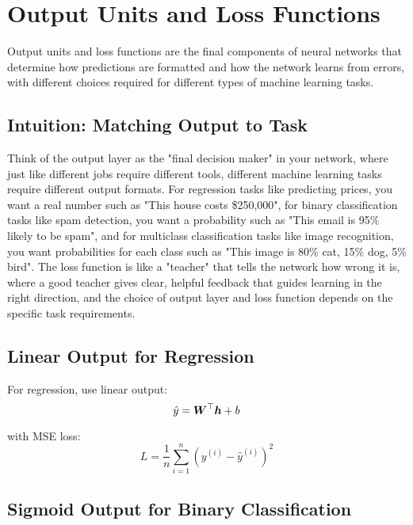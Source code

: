 
\section{Output Units and Loss Functions }
\label{sec:output-loss}

Output units and loss functions are the final components of neural networks that determine how predictions are formatted and how the network learns from errors, with different choices required for different types of machine learning tasks.

\subsection{Intuition: Matching Output to Task}

Think of the output layer as the "final decision maker" in your network, where just like different jobs require different tools, different machine learning tasks require different output formats. For regression tasks like predicting prices, you want a real number such as "This house costs \$250,000", for binary classification tasks like spam detection, you want a probability such as "This email is 95\% likely to be spam", and for multiclass classification tasks like image recognition, you want probabilities for each class such as "This image is 80\% cat, 15\% dog, 5\% bird". The loss function is like a "teacher" that tells the network how wrong it is, where a good teacher gives clear, helpful feedback that guides learning in the right direction, and the choice of output layer and loss function depends on the specific task requirements.

\subsection{Linear Output for Regression}

For regression, use linear output:
\begin{equation}
\hat{y} = \boldsymbol{W}^\top \boldsymbol{h} + b
\end{equation}

with MSE loss:
\begin{equation}
L = \frac{1}{n} \sum_{i=1}^{n} (y^{(i)} - \hat{y}^{(i)})^2
\end{equation}

\subsection{Sigmoid Output for Binary Classification}

